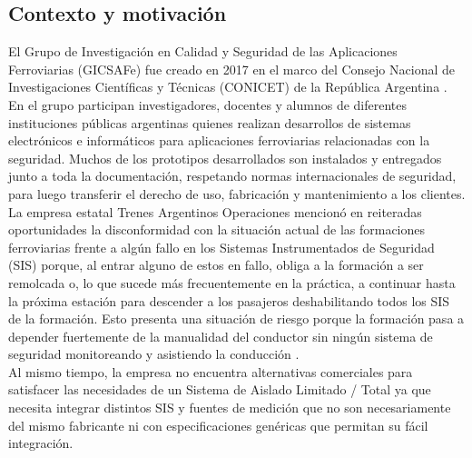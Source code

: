 
\subsection{Contexto y motivación}

El Grupo de Investigación en Calidad y Seguridad de las Aplicaciones Ferroviarias (GICSAFe) fue creado en 2017 en el marco del Consejo Nacional de Investigaciones Científicas y Técnicas (CONICET) de la República Argentina \cite{gicsafe}. En el grupo participan investigadores, docentes y alumnos de diferentes instituciones públicas argentinas quienes realizan desarrollos de sistemas electrónicos e informáticos para aplicaciones ferroviarias relacionadas con la seguridad. Muchos de los prototipos desarrollados son instalados y entregados junto a toda la documentación, respetando normas internacionales de seguridad, para luego transferir el derecho de uso, fabricación y mantenimiento a los clientes. \\



La empresa estatal Trenes Argentinos Operaciones \cite{trenes_arg} mencionó en reiteradas oportunidades la disconformidad con la situación actual de las formaciones ferroviarias frente a algún fallo en los Sistemas Instrumentados de Seguridad (SIS) porque, al entrar alguno de estos en fallo, obliga a la formación a ser remolcada o, lo que sucede más frecuentemente en la práctica, a continuar hasta la próxima estación para descender a los pasajeros deshabilitando todos los SIS de la formación. Esto presenta una situación de riesgo porque la formación pasa a depender fuertemente de la manualidad del conductor sin ningún sistema de seguridad monitoreando y asistiendo la conducción \cite{salt_paper}. \\

Al mismo tiempo, la empresa no encuentra alternativas comerciales para satisfacer las necesidades de un Sistema de Aislado Limitado / Total ya que necesita integrar distintos SIS y fuentes de medición que no son necesariamente del mismo fabricante ni con especificaciones genéricas que permitan su fácil integración.  \\

